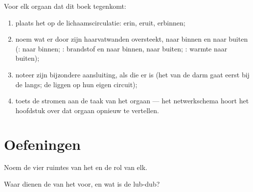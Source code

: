 \begin{method}\label{met:g7:heart-and-circulation:map}
Voor elk orgaan dat dit boek tegenkomt:
\begin{enumerate}
  \item plaats het op de lichaamscirculatie:  erin,  eruit,
         erbinnen;
  \item noem wat er door zijn haarvatwanden oversteekt, naar binnen en
        naar buiten (:  naar binnen; :
        brandstof en  naar binnen,  naar buiten;
        : warmte naar buiten);
  \item noteer zijn bijzondere aansluiting, als die er is (het  van
        de darm gaat eerst bij de  langs; de  liggen op hun
        eigen circuit);
  \item toets de stromen aan de taak van het orgaan --- het netwerkschema
        hoort het hoofdstuk over dat orgaan opnieuw te vertellen.
\end{enumerate}
\end{method}

\section{Oefeningen}

\begin{exercise}[$\star$]\label{exo:g7:heart-and-circulation:1}
Noem de vier ruimtes van het  en de rol van elk.
\end{exercise}

\begin{exercise}[$\star$]\label{exo:g7:heart-and-circulation:2}
Waar dienen de  van het  voor, en wat is de lub-dub?
\end{exercise}

